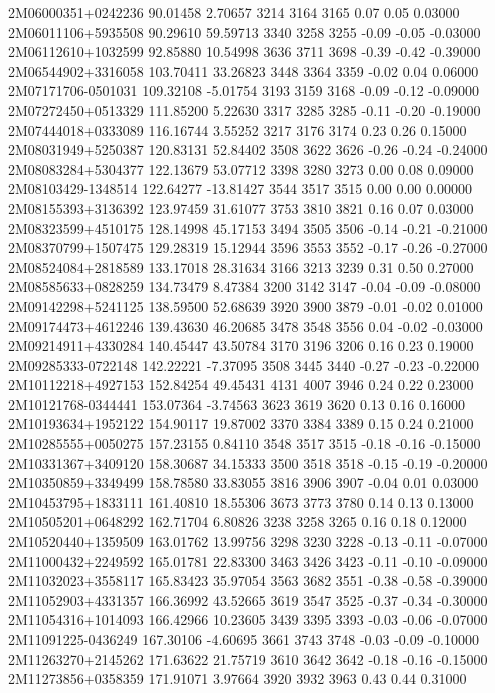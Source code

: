 2M06000351+0242236  90.01458   2.70657 3214 3164 3165  0.07  0.05  0.03000 
2M06011106+5935508  90.29610  59.59713 3340 3258 3255 -0.09 -0.05 -0.03000 
2M06112610+1032599  92.85880  10.54998 3636 3711 3698 -0.39 -0.42 -0.39000 
2M06544902+3316058 103.70411  33.26823 3448 3364 3359 -0.02  0.04  0.06000 
2M07171706-0501031 109.32108  -5.01754 3193 3159 3168 -0.09 -0.12 -0.09000 
2M07272450+0513329 111.85200   5.22630 3317 3285 3285 -0.11 -0.20 -0.19000 
2M07444018+0333089 116.16744   3.55252 3217 3176 3174  0.23  0.26  0.15000 
2M08031949+5250387 120.83131  52.84402 3508 3622 3626 -0.26 -0.24 -0.24000 
2M08083284+5304377 122.13679  53.07712 3398 3280 3273  0.00  0.08  0.09000 
2M08103429-1348514 122.64277 -13.81427 3544 3517 3515  0.00  0.00  0.00000 
2M08155393+3136392 123.97459  31.61077 3753 3810 3821  0.16  0.07  0.03000 
2M08323599+4510175 128.14998  45.17153 3494 3505 3506 -0.14 -0.21 -0.21000 
2M08370799+1507475 129.28319  15.12944 3596 3553 3552 -0.17 -0.26 -0.27000 
2M08524084+2818589 133.17018  28.31634 3166 3213 3239  0.31  0.50  0.27000 
2M08585633+0828259 134.73479   8.47384 3200 3142 3147 -0.04 -0.09 -0.08000 
2M09142298+5241125 138.59500  52.68639 3920 3900 3879 -0.01 -0.02  0.01000 
2M09174473+4612246 139.43630  46.20685 3478 3548 3556  0.04 -0.02 -0.03000 
2M09214911+4330284 140.45447  43.50784 3170 3196 3206  0.16  0.23  0.19000 
2M09285333-0722148 142.22221  -7.37095 3508 3445 3440 -0.27 -0.23 -0.22000 
2M10112218+4927153 152.84254  49.45431 4131 4007 3946  0.24  0.22  0.23000 
2M10121768-0344441 153.07364  -3.74563 3623 3619 3620  0.13  0.16  0.16000 
2M10193634+1952122 154.90117  19.87002 3370 3384 3389  0.15  0.24  0.21000 
2M10285555+0050275 157.23155   0.84110 3548 3517 3515 -0.18 -0.16 -0.15000 
2M10331367+3409120 158.30687  34.15333 3500 3518 3518 -0.15 -0.19 -0.20000 
2M10350859+3349499 158.78580  33.83055 3816 3906 3907 -0.04  0.01  0.03000 
2M10453795+1833111 161.40810  18.55306 3673 3773 3780  0.14  0.13  0.13000 
2M10505201+0648292 162.71704   6.80826 3238 3258 3265  0.16  0.18  0.12000 
2M10520440+1359509 163.01762  13.99756 3298 3230 3228 -0.13 -0.11 -0.07000 
2M11000432+2249592 165.01781  22.83300 3463 3426 3423 -0.11 -0.10 -0.09000 
2M11032023+3558117 165.83423  35.97054 3563 3682 3551 -0.38 -0.58 -0.39000 
2M11052903+4331357 166.36992  43.52665 3619 3547 3525 -0.37 -0.34 -0.30000 
2M11054316+1014093 166.42966  10.23605 3439 3395 3393 -0.03 -0.06 -0.07000 
2M11091225-0436249 167.30106  -4.60695 3661 3743 3748 -0.03 -0.09 -0.10000 
2M11263270+2145262 171.63622  21.75719 3610 3642 3642 -0.18 -0.16 -0.15000 
2M11273856+0358359 171.91071   3.97664 3920 3932 3963  0.43  0.44  0.31000 
